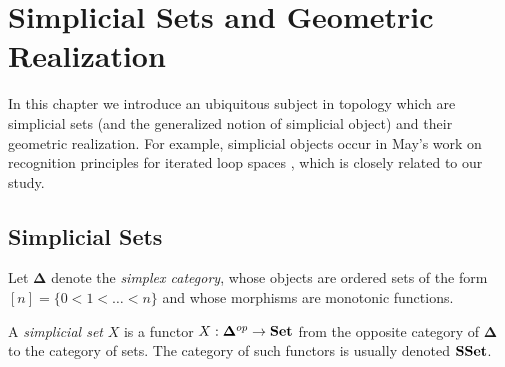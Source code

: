 \documentclass[TFM.tex]{subfiles}
\begin{document}
\chapter{Simplicial Sets and Geometric Realization}




In this chapter we introduce an ubiquitous subject in topology which are simplicial sets (and the generalized notion of simplicial object) and their geometric realization. For example, simplicial objects occur in May's work on recognition principles for iterated loop spaces \cite{simplicial}, which is closely related to our study.

%
%




\section{Simplicial Sets}

Let $\mathbf{\Delta}$ denote the \emph{simplex category}, whose objects are ordered sets of the form $[n]=\{0<1<\dots< n\}$ and whose morphisms are monotonic functions. 

\begin{defi}
A \emph{simplicial set} $X$ is a functor $X:\mathbf{\Delta}^{op}\to\mathrm{\mathbf{Set}}$ from the opposite category of $\mathbf{\Delta}$ to the category of sets. The category of such functors is usually denoted $\mathrm{\mathbf{SSet}}$. 
\end{defi}
\end{document}
